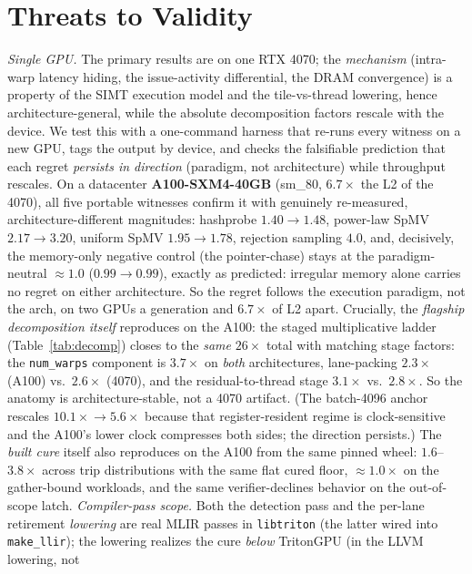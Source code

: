 \documentclass[sigplan,10pt]{acmart}
\begin{document}
\section{Threats to Validity}
\emph{Single GPU.} The primary results are on one RTX 4070; the \emph{mechanism} (intra-warp latency
hiding, the issue-activity differential, the DRAM convergence) is a property of the SIMT execution model
and the tile-vs-thread lowering, hence architecture-general, while the absolute decomposition factors
rescale with the device. We test this with a one-command harness that re-runs every witness on a new GPU,
tags the output by device, and checks the falsifiable prediction that each regret \emph{persists in
direction} (paradigm, not architecture) while throughput rescales. On a datacenter \textbf{A100-SXM4-40GB}
(sm\_80, $6.7\times$ the L2 of the 4070), all five portable witnesses confirm it with genuinely
re-measured, architecture-different magnitudes: hashprobe $1.40\!\to\!1.48$, power-law SpMV
$2.17\!\to\!3.20$, uniform SpMV $1.95\!\to\!1.78$, rejection sampling $4.0$, and, decisively, the
memory-only negative control (the pointer-chase) stays at the paradigm-neutral $\approx\!1.0$
($0.99\!\to\!0.99$), exactly as predicted: irregular memory alone carries no regret on either
architecture. So the regret follows the execution paradigm, not the arch, on two GPUs a generation and
$6.7\times$ of L2 apart. Crucially, the \emph{flagship decomposition itself} reproduces on the A100: the staged multiplicative ladder (Table~\ref{tab:decomp}) closes to the \emph{same} $26\times$ total with matching stage factors: the \texttt{num\_warps} component is $3.7\times$ on \emph{both} architectures, lane-packing $2.3\times$ (A100) vs.\ $2.6\times$ (4070), and the residual-to-thread stage $3.1\times$ vs.\ $2.8\times$. So the anatomy is architecture-stable, not a 4070 artifact. (The batch-4096 anchor rescales $10.1\times\!\to\!5.6\times$ because that register-resident regime is clock-sensitive and the A100's lower clock compresses both sides; the direction persists.) The \emph{built cure} itself also reproduces on the A100 from the same pinned wheel:
$1.6$--$3.8\times$ across trip distributions with the same flat cured floor, ${\approx}1.0\times$ on the
gather-bound workloads, and the same verifier-declines behavior on the out-of-scope latch.
\emph{Compiler-pass scope.} Both the detection pass and the per-lane
retirement \emph{lowering} are real MLIR passes in \texttt{libtriton} (the latter wired into
\texttt{make\_llir}); the lowering realizes the cure \emph{below} TritonGPU (in the LLVM lowering, not
\end{document}
